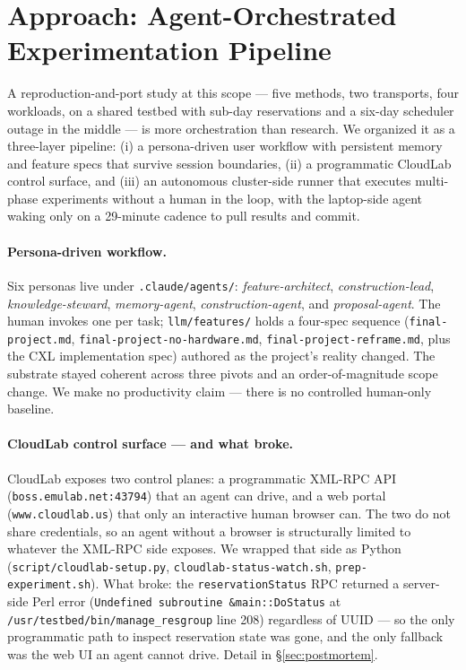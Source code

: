 \documentclass[11pt,a4paper]{article}
\begin{document}
\section{Approach: Agent-Orchestrated Experimentation Pipeline}
\label{sec:approach}

A reproduction-and-port study at this scope --- five methods, two transports, four workloads, on a shared testbed with sub-day reservations and a six-day scheduler outage in the middle --- is more orchestration than research. We organized it as a three-layer pipeline: (i) a persona-driven user workflow with persistent memory and feature specs that survive session boundaries, (ii) a programmatic CloudLab control surface, and (iii) an autonomous cluster-side runner that executes multi-phase experiments without a human in the loop, with the laptop-side agent waking only on a 29-minute cadence to pull results and commit.

\paragraph{Persona-driven workflow.} Six personas live under \texttt{.claude/agents/}: \emph{feature-architect}, \emph{construction-lead}, \emph{knowledge-steward}, \emph{memory-agent}, \emph{construction-agent}, and \emph{proposal-agent}. The human invokes one per task; \texttt{llm/features/} holds a four-spec sequence (\texttt{final-project.md}, \texttt{final-project-no-hardware.md}, \texttt{final-project-reframe.md}, plus the CXL implementation spec) authored as the project's reality changed. The substrate stayed coherent across three pivots and an order-of-magnitude scope change. We make no productivity claim --- there is no controlled human-only baseline.

\paragraph{CloudLab control surface --- and what broke.}\label{sec:approach:cloudlab} CloudLab exposes two control planes: a programmatic XML-RPC API (\texttt{boss.emulab.net:43794}) that an agent can drive, and a web portal (\texttt{www.cloudlab.us}) that only an interactive human browser can. The two do not share credentials, so an agent without a browser is structurally limited to whatever the XML-RPC side exposes. We wrapped that side as Python (\texttt{script/cloudlab-setup.py}, \texttt{cloudlab-status-watch.sh}, \texttt{prep-experiment.sh}). What broke: the \texttt{reservationStatus} RPC returned a server-side Perl error (\texttt{Undefined subroutine \&main::DoStatus} at \texttt{/usr/testbed/bin/manage\_resgroup} line 208) regardless of UUID --- so the only programmatic path to inspect reservation state was gone, and the only fallback was the web UI an agent cannot drive. Detail in \S\ref{sec:postmortem}.
\end{document}

